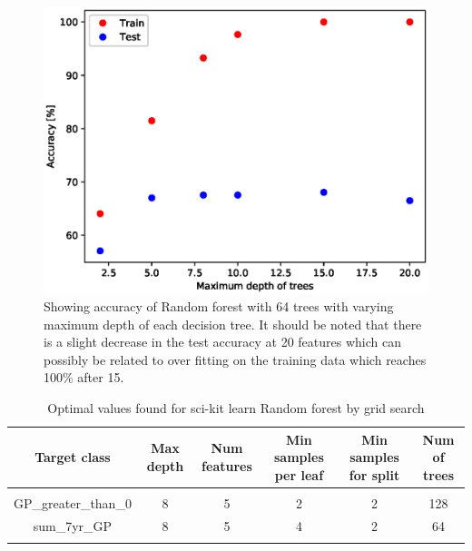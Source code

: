 \documentclass{article} %
\begin{document}
\begin{figure}[h]
\begin{center}
\includegraphics[scale=0.5]{max_depth}
\end{center}
\caption{Showing accuracy of Random forest with 64 trees with varying maximum depth of each decision tree. It should be noted that there is a slight decrease in the test accuracy at 20 features which can possibly be related to over fitting on the training data which reaches 100\% after 15.}
\label{fig:max_depth}
\end{figure}

\begin{table}[t]
\caption{Optimal values found for sci-kit learn Random forest by grid search}
\begin{center}
\begin{tabular}{cccccc}
{\bf Target class} &{\bf Max depth} &{\bf Num features} &{\bf Min samples per leaf} &{\bf Min samples for split} &{\bf Num of trees}
\\ \hline \\
GP\_greater\_than\_0         &8	&5	&2	&2	&128 \\
sum\_7yr\_GP         &8	&5	&4	&2	&64 \\
\label{scikit-table}
\end{tabular}
\end{center}
\end{table}
\end{document}
